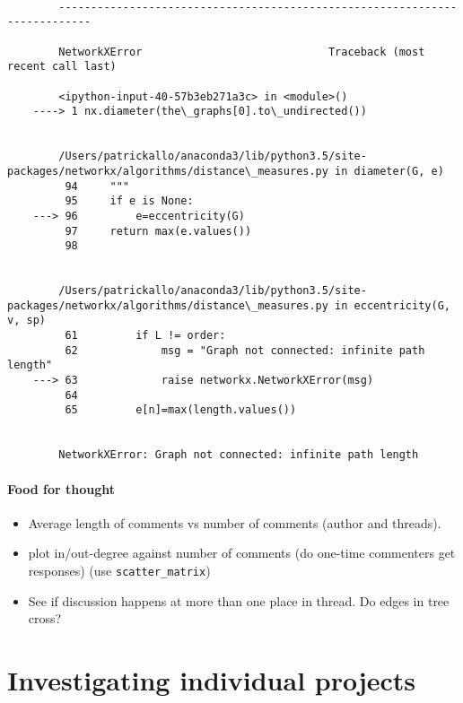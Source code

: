 \documentclass[article, floatfix, groupaddress, prb]{revtex4-1}
\providecommand{\tightlist}{%
      \setlength{\itemsep}{0pt}\setlength{\parskip}{0pt}}
\begin{document}
    \begin{Verbatim}[commandchars=\\\{\}]

        ---------------------------------------------------------------------------

        NetworkXError                             Traceback (most recent call last)

        <ipython-input-40-57b3eb271a3c> in <module>()
    ----> 1 nx.diameter(the\_graphs[0].to\_undirected())
    

        /Users/patrickallo/anaconda3/lib/python3.5/site-packages/networkx/algorithms/distance\_measures.py in diameter(G, e)
         94     """
         95     if e is None:
    ---> 96         e=eccentricity(G)
         97     return max(e.values())
         98 


        /Users/patrickallo/anaconda3/lib/python3.5/site-packages/networkx/algorithms/distance\_measures.py in eccentricity(G, v, sp)
         61         if L != order:
         62             msg = "Graph not connected: infinite path length"
    ---> 63             raise networkx.NetworkXError(msg)
         64 
         65         e[n]=max(length.values())


        NetworkXError: Graph not connected: infinite path length

    \end{Verbatim}






    \paragraph{Food for thought}\label{food-for-thought}

\begin{itemize}
\tightlist
\item
  Average length of comments vs number of comments (author and threads).
\item
  plot in/out-degree against number of comments (do one-time commenters
  get responses) (use \texttt{scatter\_matrix})
\item
  See if discussion happens at more than one place in thread. Do edges
  in tree cross?
\end{itemize}

    \section{Investigating individual
projects}\label{investigating-individual-projects}
\end{document}
